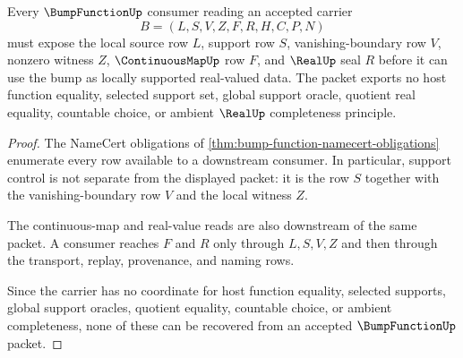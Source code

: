 \begin{theorem}
\label{thm:bump-function-support-nonescape}
Every $\BumpFunctionUp$ consumer reading an accepted carrier
$$
B=(L,S,V,Z,F,R,H,C,P,N)
$$
must expose the local source row $L$, support row $S$, vanishing-boundary row $V$, nonzero witness $Z$, $\ContinuousMapUp$ row $F$, and $\RealUp$ seal $R$ before it can use the bump as locally supported real-valued data. The packet exports no host function equality, selected support set, global support oracle, quotient real equality, countable choice, or ambient $\RealUp$ completeness principle.
\end{theorem}
\begin{proof}
The NameCert obligations of \autoref{thm:bump-function-namecert-obligations} enumerate every row available to a downstream consumer. In particular, support control is not separate from the displayed packet: it is the row $S$ together with the vanishing-boundary row $V$ and the local witness $Z$.

The continuous-map and real-value reads are also downstream of the same packet. A consumer reaches $F$ and $R$ only through $L,S,V,Z$ and then through the transport, replay, provenance, and naming rows.

Since the carrier has no coordinate for host function equality, selected supports, global support oracles, quotient equality, countable choice, or ambient completeness, none of these can be recovered from an accepted $\BumpFunctionUp$ packet.
\end{proof}



